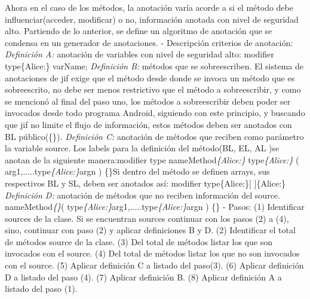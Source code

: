 Ahora en el caso de los métodos, la anotación varía acorde a si el método debe
influenciar(acceder, modificar) o no, información anotada con nivel de seguridad
alto.
Partiendo de lo anterior, se define un algoritmo de anotación que se condensa en
un generador de anotaciones.\newline 
- Descripción criterios de anotación:\newline
\textit{Definición A:} anotación de variables con nivel de seguridad alto:
\newline 
modifier type\{Alice:\} varName;\newline 
\textit{Definición B:} métodos que se sobreescriben. El sistema de anotaciones
de jif exige que el método desde donde se invoca un método que es sobreescrito, no debe ser menos restrictivo que el método a sobreescribir, y como se mencionó
al final del paso uno, los métodos a sobreescribir deben poder ser invocados
desde todo programa Android, siguiendo con este principio, y buscando que jif
no limite el flujo de información, estos métodos deben ser anotados con BL
público(\{\}).\newline
\textit{Definición C:} anotación de métodos que reciben como parámetro la
variable source.
Los labels para la definición del método(BL, EL, AL )se anotan de la
siguiente manera:\newline modifier type
nameMethod\textit{\{Alice:\}} type\textit{\{Alice:\}}
( arg1,.....type\textit{\{Alice:\}}argn ) \{\}\newline Si dentro del método se
definen arrays, sus respectivos BL y SL, deben ser anotados así: modifier type\{Alice:\}[ ]\{Alice:\}\newline
\textit{Definición D:} anotación de métodos que no reciben información del
source. 
nameMethod\textit{\{\}}(
type\textit{\{Alice:\}}arg1,.....type\textit{\{Alice:\}}argn ) \{\}\newline
- Pasos:\newline
(1) Identificar sources de la clase. Si se encuentran sources continuar con
los pasos (2) a (4), sino, continuar con paso (2) y aplicar definiciones B y
D.\newline
(2) Identificar el total de métodos source de la clase.\newline
(3) Del total de métodos listar los que son invocados con el source.\newline
(4) Del total de métodos listar los que no son invocados con el source.\newline
(5) Aplicar definición C a listado del paso(3).\newline
(6) Aplicar definición D a listado del paso (4).\newline
(7) Aplicar definición B. \newline
(8) Aplicar definición A a listado del paso (1).



